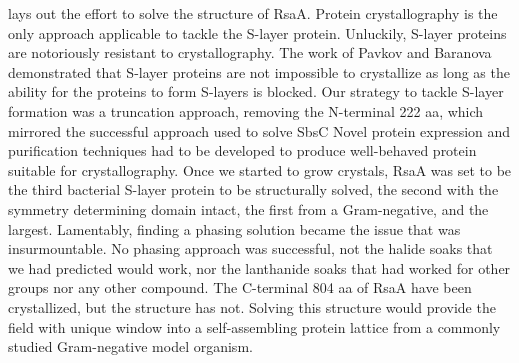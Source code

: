  lays out the effort to solve the structure of RsaA. Protein crystallography is the only approach applicable to tackle the \caulobacter{} \ac{S-layer} protein. Unluckily, \ac{S-layer} proteins are notoriously resistant to crystallography. The work of Pavkov \etal{} and Baranova \etal{} demonstrated that \ac{S-layer} proteins are not impossible to crystallize as long as the ability for the proteins to form \acp{S-layer} is blocked. Our strategy to tackle \ac{S-layer} formation was a truncation approach, removing the N-terminal 222 \ac{aa}, which mirrored the successful approach used to solve SbsC Novel protein expression and purification techniques had to be developed to produce well-behaved protein suitable for crystallography. Once we started to grow crystals, RsaA was set to be the third bacterial \ac{S-layer} protein to be structurally solved, the second with the symmetry determining domain intact, the first from a Gram-negative, and the largest. Lamentably, finding a phasing solution became the issue that was insurmountable. No phasing approach was successful, not the halide soaks that we had predicted would work, nor the lanthanide soaks that had worked for other groups nor any other compound. The C-terminal 804 \ac{aa} of RsaA have been crystallized, but the structure has not. Solving this structure would provide the field with unique window into a self-assembling protein lattice from a commonly studied Gram-negative model organism. 

